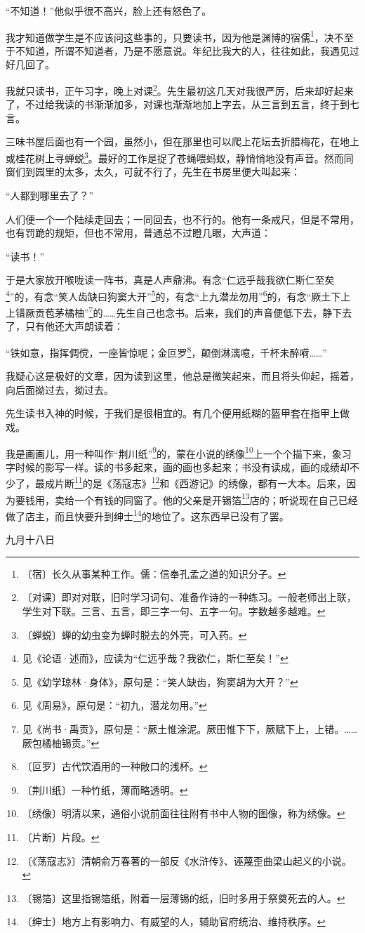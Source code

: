 \documentclass[12pt,UTF-8,openany]{ctexbook}
\begin{document}
\begin{large}
    “不知道！”他似乎很不高兴，脸上还有怒色了。
    
    我才知道做学生是不应该问这些事的，只要读书，因为他是渊博的宿儒\footnote{〔宿〕长久从事某种工作。儒：信奉孔孟之道的知识分子。}，决不至于不知道，所谓不知道者，乃是不愿意说。年纪比我大的人，往往如此，我遇见过好几回了。
    
    我就只读书，正午习字，晚上对课\footnote{〔对课〕即对对联，旧时学习词句、准备作诗的一种练习。一般老师出上联，学生对下联。三言、五言，即三字一句、五字一句。字数越多越难。}。先生最初这几天对我很严厉，后来却好起来了，不过给我读的书渐渐加多，对课也渐渐地加上字去，从三言到五言，终于到七言。
    
    三味书屋后面也有一个园，虽然小，但在那里也可以爬上花坛去折腊梅花，在地上或桂花树上寻蝉蜕\footnote{〔蝉蜕〕蝉的幼虫变为蝉时脱去的外壳，可入药。}。最好的工作是捉了苍蝇喂蚂蚁，静悄悄地没有声音。然而同窗们到园里的太多，太久，可就不行了，先生在书房里便大叫起来：
    
    “人都到哪里去了？”
    
    人们便一个一个陆续走回去；一同回去，也不行的。他有一条戒尺，但是不常用，也有罚跪的规矩，但也不常用，普通总不过瞪几眼，大声道：
    
    “读书！”
    
    于是大家放开喉咙读一阵书，真是人声鼎沸。有念“仁远乎哉我欲仁斯仁至矣\footnote{见《论语·述而》，应读为“仁远乎哉？我欲仁，斯仁至矣！”}”的，有念“笑人齿缺曰狗窦大开”\footnote{见《幼学琼林·身体》，原句是：“笑人缺齿，狗窦胡为大开？”}的，有念“上九潜龙勿用”\footnote{见《周易》，原句是：“初九，潜龙勿用。”}的，有念“厥土下上上错厥贡苞茅橘柚”\footnote{见《尚书·禹贡》，原句是：“厥土惟涂泥。厥田惟下下，厥赋下上，上错。……厥包橘柚锡贡。”}的……先生自己也念书。后来，我们的声音便低下去，静下去了，只有他还大声朗读着：
    
    “铁如意，指挥倜傥，一座皆惊呢；金叵罗\footnote{〔叵罗〕古代饮酒用的一种敞口的浅杯。}，颠倒淋漓噫，千杯未醉嗬……”
    
    我疑心这是极好的文章，因为读到这里，他总是微笑起来，而且将头仰起，摇着，向后面拗过去，拗过去。
    
    先生读书入神的时候，于我们是很相宜的。有几个便用纸糊的盔甲套在指甲上做戏。
    
    我是画画儿，用一种叫作“荆川纸”\footnote{〔荆川纸〕一种竹纸，薄而略透明。}的，蒙在小说的绣像\footnote{〔绣像〕明清以来，通俗小说前面往往附有书中人物的图像，称为绣像。}上一个个描下来，象习字时候的影写一样。读的书多起来，画的画也多起来；书没有读成，画的成绩却不少了，最成片断\footnote{〔片断〕片段。}的是《荡寇志》\footnote{〔《荡寇志》〕清朝俞万春著的一部反《水浒传》、诬蔑歪曲梁山起义的小说。}和《西游记》的绣像，都有一大本。后来，因为要钱用，卖给一个有钱的同窗了。他的父亲是开锡箔\footnote{〔锡箔〕这里指锡箔纸，附着一层薄锡的纸，旧时多用于祭奠死去的人。}店的；听说现在自己已经做了店主，而且快要升到绅士\footnote{〔绅士〕地方上有影响力、有威望的人，辅助官府统治、维持秩序。}的地位了。这东西早已没有了罢。
    
    \hfill 九月十八日
    
\end{large}
\end{document}
